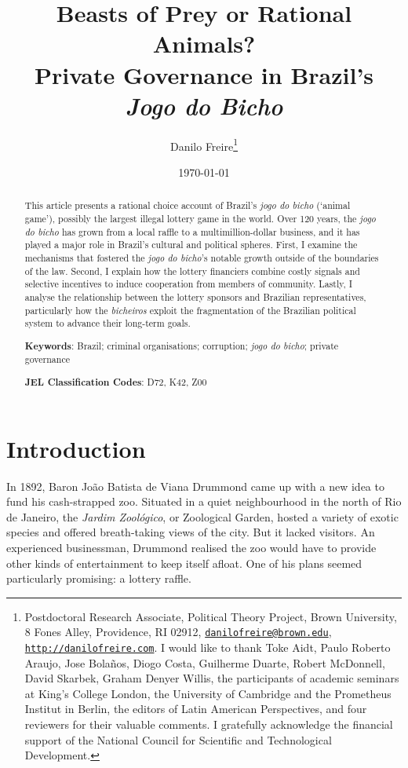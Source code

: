 \documentclass[a4paper,12pt]{article}
\title{\textbf{Beasts of Prey or Rational Animals?\\ Private Governance in Brazil's \textit{Jogo do Bicho}}}
\author{Danilo Freire\thanks{Postdoctoral Research Associate, Political Theory Project, Brown University, 8 Fones Alley, Providence, RI 02912, \href{mailto:danilofreire@brown.edu}{\texttt{danilofreire@brown.edu}}, \href{http://danilofreire.com}{\texttt{http://danilofreire.com}}. I would like to thank Toke Aidt, Paulo Roberto Araujo, Jose Bolaños, Diogo Costa, Guilherme Duarte, Robert McDonnell, David Skarbek, Graham Denyer Willis, the participants of academic seminars at King's College London, the University of Cambridge and the Prometheus Institut in Berlin, the editors of Latin American Perspectives, and four reviewers for their valuable comments. I gratefully acknowledge the financial support of the National Council for Scientific and Technological Development.}
}
\date{\today}
\begin{document}
\maketitle

\begin{abstract}
\noindent
This article presents a rational choice account of Brazil's \textit{jogo do bicho} (`animal game'), possibly the largest illegal lottery game in the world. Over 120 years, the \textit{jogo do bicho} has grown from a local raffle to a multimillion-dollar business, and it has played a major role in Brazil's cultural and political spheres. First, I examine the mechanisms that fostered the \textit{jogo do bicho}'s notable growth outside of the boundaries of the law. Second, I explain how the lottery financiers combine costly signals and selective incentives to induce cooperation from members of community. Lastly, I analyse the relationship between the lottery sponsors and Brazilian representatives, particularly how the \textit{bicheiros} exploit the fragmentation of the Brazilian political system to advance their long-term goals. 

 \vspace{.5cm}
 \noindent
 \textbf{Keywords}: Brazil; criminal organisations; corruption; \textit{jogo do bicho}; private governance
  
 \vspace{.25cm}
 \noindent
 \textbf{JEL Classification Codes}: D72, K42, Z00
\end{abstract}

\newpage

\section{Introduction}
\label{sec:intro}

In 1892, Baron João Batista de Viana Drummond came up with a new idea to fund his cash-strapped zoo. Situated in a quiet neighbourhood in the north of Rio de Janeiro, the \textit{Jardim Zoológico}, or Zoological Garden, hosted a variety of exotic species and offered breath-taking views of the city. But it lacked visitors. An experienced businessman, Drummond realised the zoo would have to provide other kinds of entertainment to keep itself afloat. One of his plans seemed particularly promising: a lottery raffle.
\end{document}
